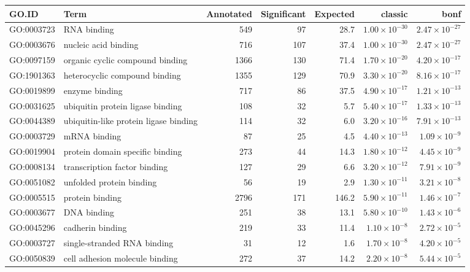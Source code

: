  \begin{table}[ht]
\centering
\begin{adjustbox}{max width=\textwidth}
\begin{tabular}{llrrrrr}
  \hline
GO.ID & Term & Annotated & Significant & Expected & classic & bonf \\ 
  \hline
GO:0003723 & RNA binding & 549 & 97 & 28.7 & $1.00 \times 10^{-30}$ & $2.47 \times 10^{-27}$ \\ 
  GO:0003676 & nucleic acid binding & 716 & 107 & 37.4 & $1.00 \times 10^{-30}$ & $2.47 \times 10^{-27}$ \\ 
  GO:0097159 & organic cyclic compound binding & 1366 & 130 & 71.4 & $1.70 \times 10^{-20}$ & $4.20 \times 10^{-17}$ \\ 
  GO:1901363 & heterocyclic compound binding & 1355 & 129 & 70.9 & $3.30 \times 10^{-20}$ & $8.16 \times 10^{-17}$ \\ 
  GO:0019899 & enzyme binding & 717 & 86 & 37.5 & $4.90 \times 10^{-17}$ & $1.21 \times 10^{-13}$ \\ 
  GO:0031625 & ubiquitin protein ligase binding & 108 & 32 & 5.7 & $5.40 \times 10^{-17}$ & $1.33 \times 10^{-13}$ \\ 
  GO:0044389 & ubiquitin-like protein ligase binding & 114 & 32 & 6.0 & $3.20 \times 10^{-16}$ & $7.91 \times 10^{-13}$ \\ 
  GO:0003729 & mRNA binding & 87 & 25 & 4.5 & $4.40 \times 10^{-13}$ & $1.09 \times 10^{-9}$ \\ 
  GO:0019904 & protein domain specific binding & 273 & 44 & 14.3 & $1.80 \times 10^{-12}$ & $4.45 \times 10^{-9}$ \\ 
  GO:0008134 & transcription factor binding & 127 & 29 & 6.6 & $3.20 \times 10^{-12}$ & $7.91 \times 10^{-9}$ \\ 
  GO:0051082 & unfolded protein binding & 56 & 19 & 2.9 & $1.30 \times 10^{-11}$ & $3.21 \times 10^{-8}$ \\ 
  GO:0005515 & protein binding & 2796 & 171 & 146.2 & $5.90 \times 10^{-11}$ & $1.46 \times 10^{-7}$ \\ 
  GO:0003677 & DNA binding & 251 & 38 & 13.1 & $5.80 \times 10^{-10}$ & $1.43 \times 10^{-6}$ \\ 
  GO:0045296 & cadherin binding & 219 & 33 & 11.4 & $1.10 \times 10^{-8}$ & $2.72 \times 10^{-5}$ \\ 
  GO:0003727 & single-stranded RNA binding & 31 & 12 & 1.6 & $1.70 \times 10^{-8}$ & $4.20 \times 10^{-5}$ \\ 
  GO:0050839 & cell adhesion molecule binding & 272 & 37 & 14.2 & $2.20 \times 10^{-8}$ & $5.44 \times 10^{-5}$ \\ 

\end{tabular}
\end{adjustbox}
\end{table}
